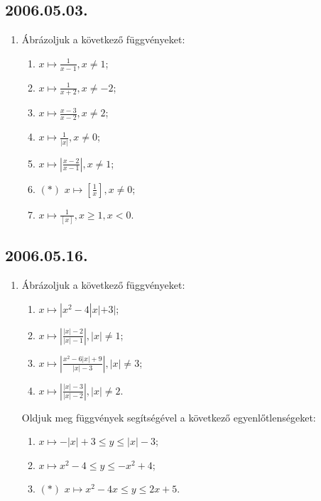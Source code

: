 \documentclass{article}
\newenvironment{abc}{\begin{enumerate}[label=\textit{\alph*})]}{\end{enumerate}}
\begin{document}
\subsection*{2006.05.03.}
\begin{enumerate}
\item Ábrázoljuk a következő függvényeket:
\begin{abc}
\item $x \mapsto \frac{1}{x-1}, x\neq1$;
\item $x \mapsto \frac{1}{x+2}, x\neq-2$;
\item $x \mapsto \frac{x-3}{x-2}, x\neq2$;
\item $x \mapsto \frac{1}{|x|}, x\neq0$;
\item $x \mapsto \left|\frac{x-2}{x-1}\right|, x\neq1$;
\item $(*)$ $ x \mapsto \left[\frac{1}{x}\right], x\neq0$;
\item $x \mapsto \frac{1}{[x]}, x\ge 1, x<0$.
\end{abc}
\end{enumerate}

\subsection*{2006.05.16.}
\begin{enumerate}
\item Ábrázoljuk a következő függvényeket:
\begin{abc}
\item $x \mapsto |x^2-4|x|+3|$;
\item $x \mapsto \left|\frac{|x|-2}{|x|-1}\right|, |x|\neq1$;
\item $x \mapsto \left|\frac{x^2-6|x|+9}{|x|-3}\right|, |x|\neq3$;
\item $x \mapsto \left|\frac{|x|-3}{|x|-2}\right|, |x|\neq2$.
\end{abc}
Oldjuk meg függvények segítségével a következő egyenlőtlenségeket:
\begin{abc}
\item $x \mapsto -|x|+3\le y \le |x|-3$;
\item $x \mapsto x^2-4 \le y \le -x^2+4$;
\item $(*)$ $x \mapsto x^2-4x \le y \le 2x+5$.
\end{abc}
\end{enumerate}
\end{document}
